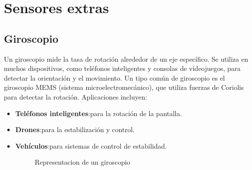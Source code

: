\section{Sensores extras}
\subsection{Giroscopio}
Un giroscopio mide la tasa de rotación alrededor de un eje específico. Se utiliza en muchos dispositivos, como teléfonos inteligentes y consolas de videojuegos, para detectar la orientación y el movimiento. Un tipo común de giroscopio es el giroscopio MEMS (sistema microelectromecánico), que utiliza fuerzas de Coriolis para detectar la rotación. Aplicaciones incluyen:
\begin{itemize}
	\item \textbf{Teléfonos inteligentes}:para la rotación de la pantalla.
	\item \textbf{Drones}:para la estabilización y control.
	\item \textbf{Vehículos}:para sistemas de control de estabilidad.
	\begin{figure}[h]
		\centering
		\hfill
		\caption{Representacion de un giroscopio}
		\label{fig:mascotas}
	\end{figure}
\end{itemize}
